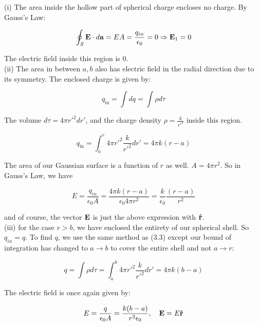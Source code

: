 \documentclass{article}
\numberwithin{equation}{section}
\numberwithin{figure}{section}
\newcommand{\vbh}[1]{\vb{\hat{#1}}}
\begin{document}
(i) The area inside the hollow part of spherical charge encloses no charge. By Gauss's Law:

\begin{equation}
    \oint_S \vb{E} \cdot d \vb{a} = EA = \frac{q_{in}}{\epsilon_0} = 0 \Rightarrow \vb{E}_{1} = 0
\end{equation}

The electric field inside this region is $0$. \\

(ii) The area in between $a, b$ also has electric field in the radial direction due to its symmetry. The enclosed charge is given by:

\begin{equation}
    q_\text{in} = \int dq = \int \rho d\tau
\end{equation}

The volume $d\tau = 4 \pi r'^2 dr'$, and the charge density $\rho = \frac{k}{r'^2}$ inside this region.

\begin{equation}
    q_\text{in} = \int_a^r 4 \pi r'^2 \frac{k}{r'^2} dr' = 4 \pi k (r - a)
\end{equation}

The area of our Gaussian surface is a function of $r$ as well. $A = 4 \pi r^2$. So in Gauss's Law, we have

\begin{equation}
    E = \frac{q_{in}}{\epsilon_0 A} = \frac{4 \pi k(r-a)}{\epsilon_0 4 \pi r^2} = \frac{k}{\epsilon_0} \frac{(r-a)}{r^2}
\end{equation}

and of course, the vector $\vb{E}$ is just the above expression with $\vbh r$. \\

(iii) for the case $r > b$, we have enclosed the entirety of our spherical shell. So $q_{in} = q$. To find $q$, we use the same method as (3.3) except our bound of integration has changed to $a \to b$ to cover the entire shell and not $a \to r$:

\begin{equation}
    q = \int \rho d \tau = \int_a^b 4 \pi r'^2 \frac{k}{r'^2} dr' = 4 \pi k (b-a)
\end{equation}

The electric field is once again given by:

\begin{equation}
    E = \frac{q}{\epsilon_0 A} = \frac{k(b-a)}{r^2 \epsilon_0},\quad  \vb{E} = E \vbh r
\end{equation}
\end{document}
